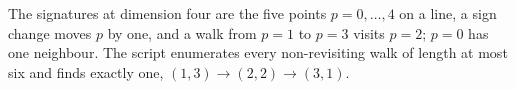 The signatures at dimension four are the five points $p = 0, \ldots, 4$ on a line, a sign change moves $p$ by one, and a walk from $p = 1$ to $p = 3$ visits $p = 2$; $p = 0$ has one neighbour. The script enumerates every non-revisiting walk of length at most six and finds exactly one, $(1,3) \to (2,2) \to (3,1)$.
